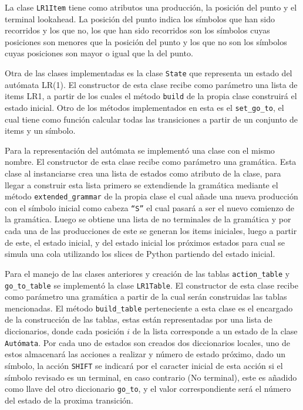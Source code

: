 \documentclass[10pt,a4paper]{article}
\begin{document}
		La clase \texttt{LR1Item} tiene como atributos una producci\'on, la posici\'on del punto y el terminal lookahead. La posici\'on del punto indica los s\'imbolos que han sido recorridos y los que no, los que han sido recorridos son los s\'imbolos cuyas posiciones son menores que la posici\'on del punto y los que no son los s\'imbolos cuyas posiciones son mayor o igual que la del punto.
		
Otra de las clases implementadas es la clase \texttt{State} que representa un estado  del aut\'omata LR(1). El constructor de esta clase recibe como par\'ametro una lista de items LR1, a partir de los cuales el m\'etodo \texttt{build} de la propia clase construir\'a el estado inicial. Otro de los m\'etodos implementados en esta es el \texttt{set\_go\_to}, el cual tiene como funci\'on calcular todas las transiciones a partir de un conjunto de items y un s\'imbolo.
		
		Para la representaci\'on del aut\'omata se implement\'o una clase con el mismo nombre. El constructor de esta clase recibe como par\'ametro una gram\'atica. Esta clase al instanciarse crea una lista de estados como atributo de la clase, para llegar a construir esta lista primero se extendiende la gram\'atica mediante el m\'etodo \texttt{extended\_grammar} de la propia clase el cual a\~nade una nueva producci\'on con el s\'imbolo inicial como cabeza \texttt{``S''} el cual pasar\'a a ser el nuevo comienzo de la gram\'atica. Luego se obtiene una lista de no terminales de la gram\'atica y por cada una de las producciones de este se generan los items iniciales, luego a partir de este, el estado inicial, y del estado inicial los pr\'oximos estados para cual se simula una cola utilizando los slices de Python partiendo del estado inicial.
		
		
		Para el manejo de las clases anteriores y creaci\'on de las tablas \texttt{action\_table} y \texttt{go\_to\_table} se implement\'o la clase \texttt{LR1Table}. El constructor de esta clase recibe como par\'ametro una gram\'atica a partir de la cual ser\'an construidas las tablas mencionadas. El m\'etodo \texttt{build\_table} perteneciente a esta clase es el encargado de la construcción de las tablas, estas est\'an representadas por una lista de diccionarios, donde cada posici\'on $i$ de la lista corresponde a un estado de la clase \texttt{Aut\'omata}. Por cada uno de estados son creados dos diccionarios locales, uno de estos almacenar\'a las acciones a realizar y n\'umero de estado pr\'oximo, dado un s\'imbolo, la acci\'on \texttt{SHIFT} se indicar\'a por el caracter inicial de esta acci\'on si el s\'imbolo revisado es un terminal, en caso contrario (No terminal), este es a\~nadido como llave del otro diccionario \texttt{go\_to}, y el valor correspondiente ser\'a el n\'umero del estado de la proxima transici\'on.
		
\end{document}
